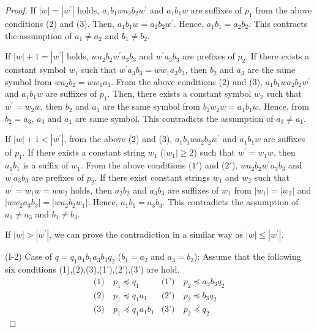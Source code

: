 \begin{proof}
If $|w|=|w^{\prime}|$ holds, $a_{1}b_{1}wa_{2}b_{2}w^{\prime}$ and $a_{1}b_{1}w$ are suffixes of $p_{1}$ from the above conditions (2) and (3).
Then, $a_{1}b_{1}w=a_{2}b_{2}w^{\prime}$.
Hence, $a_{1}b_{1}=a_{2}b_{2}$.
This contracts the assumption of $a_{1} \ne a_{2}$ and $b_{1} \ne b_{2}$.

If $|w|+1=|w^{\prime}|$ holds, $wa_{2}b_{2}w^{\prime}a_{3}b_{3}$ and $w^{\prime}a_{3}b_{3}$ are prefixes of $p_{2}$.
If there exists a constant symbol $w_{1}$ such that $w^{\prime}a_{3}b_{3}=ww_{1}a_{3}b_{3}$,
then $b_{2}$ and $a_{3}$ are the same symbol from $wa_{2}b_{2}=ww_{1}a_{3}$.
From the above conditions (2) and (3), $a_{1}b_{1}wa_{2}b_{2}w^{\prime}$ and $a_{1}b_{1}w$ are suffixes of $p_{1}$.
Then, there exists a constant symbol $w_{2}$ such that $w^{\prime}=w_{2}w$,
then $b_{2}$ and $a_{1}$ are the same symbol from $b_{2}w_{2}w=a_{1}b_{1}w$.
Hence, from $b_{2}=a_{3}$, $a_{3}$ and $a_{1}$ are same symbol.
This contradicts the assumption of $a_{3} \ne a_{1}$.

If $|w|+1 < |w^{\prime}|$, from the above (2) and (3), 
$a_{1}b_{1}wa_{2}b_{2}w^{\prime}$ and $a_{1}b_{1}w$ are suffixes of $p_{1}$.
If there exists a constant string $w_{1}$ ($|w_{1}|\geq 2$) such that $w^{\prime}=w_{1}w$, then $a_{1}b_{1}$ is a suffix of $w_{1}$.
From  the above conditions ($1'$) and ($2'$), 
$wa_{2}b_{2}w^{\prime}a_{3}b_{3}$ and $w^{\prime}a_{3}b_{3}$ are prefixes of $p_{2}$.
If there exist constant strings $w_{1}$ and $w_{2}$ such that $w^{\prime} = w_{1}w=ww_{2}$ holds, then $a_{2}b_{2}$ and $a_{3}b_{3}$ are suffixes of $w_{1}$ from $|w_1|=|w_2|$ and $|ww_{2}a_{3}b_{3}|=|wa_{2}b_{2}w_{1}|$.
Hence, $a_{1}b_{1}=a_{3}b_{3}$.
This contradicts the assumption of $a_{1} \ne a_{3}$ and $b_{1} \ne b_{3}$.

If $|w|>|w^{\prime}|$, we can prove the contradiction in a similar way as $|w|\le|w^{\prime}|$.

\smallskip

\noindent
(I-2) Case of $q=q_{1}a_{1}b_{1}a_{3}b_{3}q_{2}$ ($b_{1}=a_{2}$ and $a_{3}=b_{2}$):
Assume that the following six conditions (1),(2),(3),(1'),(2'),(3') are hold.
\begin{align*}
\textrm{(1)}~& p_{1} \preceq q_{1} & \textrm{(1')}~& p_{2} \preceq a_{3}b_{3}q_{2} \\
\textrm{(2)}~& p_{1} \preceq q_{1}a_{1} & \textrm{(2')}~& p_{2} \preceq b_{3}q_{2} \\
\textrm{(3)}~& p_{1} \preceq q_{1}a_{1}b_{1} & \textrm{(3')}~& p_{2} \preceq q_{2}
\end{align*}


\end{proof}
